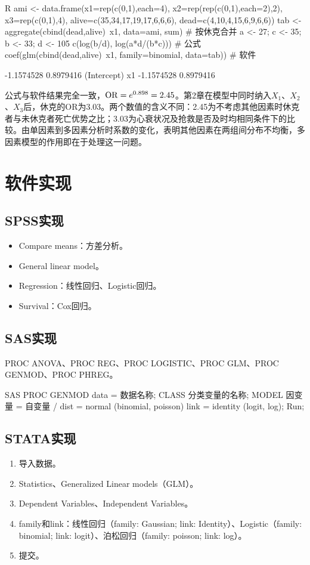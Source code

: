 \par\noindent
\begin{coursecode}{R}
ami <- data.frame(x1=rep(c(0,1),each=4), x2=rep(rep(c(0,1),each=2),2), x3=rep(c(0,1),4),
                  alive=c(35,34,17,19,17,6,6,6), dead=c(4,10,4,15,6,9,6,6))
tab <- aggregate(cbind(dead,alive)~x1, data=ami, sum)   # 按休克合并
a <- 27; c <- 35; b <- 33; d <- 105
c(log(b/d), log(a*d/(b*c)))                              # 公式
coef(glm(cbind(dead,alive)~x1, family=binomial, data=tab))   # 软件
\end{coursecode}
\begin{routput}
[1] -1.1574528  0.8979416
(Intercept)          x1 
 -1.1574528   0.8979416 
\end{routput}
公式与软件结果完全一致，$\operatorname{OR}=e^{0.898}=2.45$。第2章在模型中同时纳入$X_1$、$X_2$、$X_3$后，休克的OR为3.03。两个数值的含义不同：2.45为不考虑其他因素时休克者与未休克者死亡优势之比；3.03为心衰状况及抢救是否及时均相同条件下的比较。由单因素到多因素分析时系数的变化，表明其他因素在两组间分布不均衡，多因素模型的作用即在于处理这一问题。
\section{软件实现}
\subsection{SPSS实现}
\begin{itemize}
\item Compare means：方差分析。
\item General linear model。
\item Regression：线性回归、Logistic回归。
\item Survival：Cox回归。
\end{itemize}
\subsection{SAS实现}
PROC ANOVA、PROC REG、PROC LOGISTIC、PROC GLM、PROC GENMOD、PROC PHREG。
\par\noindent
\begin{coursecode}{SAS}
PROC GENMOD data = 数据名称;
  CLASS 分类变量的名称;
  MODEL 因变量 = 自变量 /
    dist = normal (binomial, poisson)
    link = identity (logit, log);
Run;
\end{coursecode}
\par
\subsection{STATA实现}
\begin{enumerate}
\item 导入数据。
\item Statistics、Generalized Linear models（GLM）。
\item Dependent Variables、Independent Variables。
\item family和link：线性回归（family: Gaussian; link: Identity）、Logistic（family: binomial; link: logit）、泊松回归（family: poisson; link: log）。
\item 提交。
\end{enumerate}

